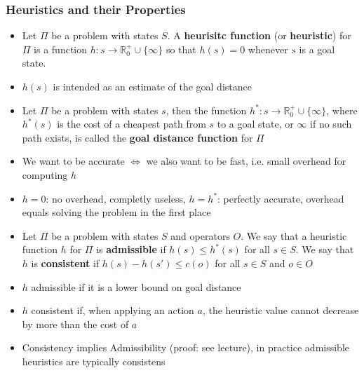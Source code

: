 \documentclass{scrartcl}
\begin{document}
\subsubsection{Heuristics and their Properties}
\begin{itemize}
    \item
        Let $\Pi$ be a problem with states $S$. A \textbf{heurisitc function} (or \textbf{heuristic}) for $\Pi$ is a function $h: s \rightarrow \mathbb{R}_0^+ \cup \{\infty \}$ so that $h(s) = 0$ whenever $s$ is a goal state.
    \item
        $h(s)$ is intended as an estimate of the goal distance
    \item
        Let $\Pi$ be a problem with states $s$, then the function $h^*: s \rightarrow \mathbb{R}_0^+ \cup \{\infty\}$, where $h^*(s)$ is the cost of a cheapest path from $s$ to a goal state, or $\infty$ if no such path exists, is called the \textbf{goal distance function} for $\Pi$
    \item
        We want to be accurate $\Leftrightarrow$ we also want to be fast, i.e. small overhead for computing $h$
    \item
        $h=0$: no overhead, completly useless, $h=h^*$: perfectly accurate, overhead equals solving the problem in the first place\\
    \item
        Let $\Pi$ be a problem with states $S$ and operators $O$. We say that a heuristic function $h$ for $\Pi$ is \textbf{admissible} if $h(s)\leq h^*(s)$ for all $s \in S$. We say that $h$ is \textbf{consistent} if $h(s) - h(s') \leq c(o)$ for all $s \in S$ and $o \in O$
    \item
        $h$ admissible if it is a lower bound on goal distance
    \item
        $h$ consistent if, when applying an action $a$, the heuristic value cannot decrease by more than the cost of $a$
    \item
        Consistency implies Admissibility (proof: see lecture), in practice admissible heuristics are typically consistens
\end{itemize}
\end{document}
